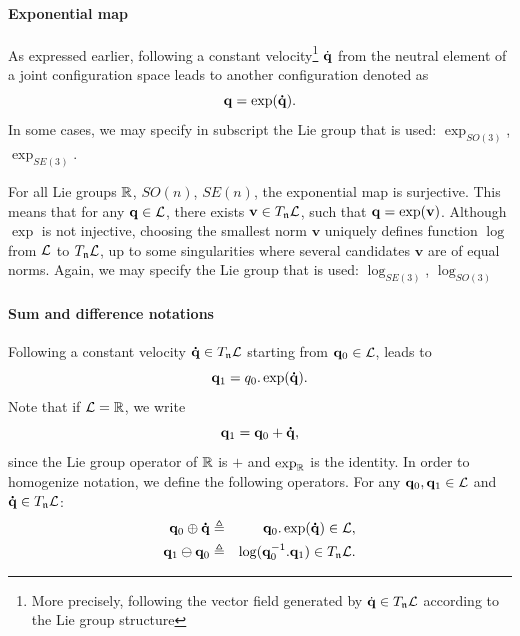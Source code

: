 \paragraph{Exponential map}

As expressed earlier, following a constant velocity\footnote{More precisely, following the vector field generated by $\dot{\mathbf{q}}\in T_{\mathfrak{n}}\mathcal{L}$ according to the Lie group structure} $\dot{\mathbf{q}}$ from the neutral element of a joint configuration space leads to another configuration denoted as
$$
\mathbf{q} = \exp(\mathbf{\dot{q}}).
$$
In some cases, we may specify in subscript the Lie group that is used: \href{https://github.com/stack-of-tasks/pinocchio/blob/f8f3b9a24eab527df79650e3dc73410f9a46a2b2/src/spatial/explog.hpp#L34}{$\exp_{SO(3)}$}, \href{https://github.com/stack-of-tasks/pinocchio/blob/f8f3b9a24eab527df79650e3dc73410f9a46a2b2/src/spatial/explog.hpp#L236}{$\exp_{SE(3)}$}.

For all Lie groups $\mathbb{R}$, $SO(n)$, $SE(n)$, the exponential map is surjective. This means that for any $\mathbf{q}\in\mathcal{L}$, there exists $\mathbf{v}\in T_{\mathfrak{n}}\mathcal{L}$, such that $\mathbf{q} = \exp(\mathbf{v})$.
Although $\exp$ is not injective, choosing the smallest norm $\mathbf{v}$ uniquely defines function $\log$ from $\mathcal{L}$ to $T_{\mathfrak{n}}\mathcal{L}$, up to some singularities where several candidates $\mathbf{v}$ are of equal norms.
Again, we may specify the Lie group that is used: \href{https://github.com/stack-of-tasks/pinocchio/blob/f8f3b9a24eab527df79650e3dc73410f9a46a2b2/src/spatial/log.hxx#L112}{$\log_{SE(3)}$}, \href{https://github.com/stack-of-tasks/pinocchio/blob/f8f3b9a24eab527df79650e3dc73410f9a46a2b2/src/spatial/log.hxx#L15}{$\log_{SO(3)}$}

\paragraph{Sum and difference notations}

Following a constant velocity $\mathbf{\dot{q}}\in T_{\mathfrak{n}}\mathcal{L}$ starting from $\mathbf{q}_0\in\mathcal{L}$, leads to
$$
\mathbf{q}_1 = q_0.\exp(\mathbf{\dot{q}}).
$$
Note that if $\mathcal{L}=\mathbb{R}$, we write
$$
\mathbf{q}_1 = \mathbf{q}_0 + \mathbf{\dot{q}},
$$
since the Lie group operator of $\mathbb{R}$ is $+$ and $\exp_{\mathbb{R}}$ is the identity.
In order to homogenize notation, we define the following operators. For any
$\mathbf{q}_0,\mathbf{q}_1\in\mathcal{L}$ and $\mathbf{\dot{q}}\in T_{\mathfrak{n}}\mathcal{L}$:
\begin{eqnarray}\label{eq:plus}
  \conf_0 \oplus \dconf &\triangleq& \conf_0.\exp(\dconf) \in \liegroup,\\
  \label{eq:minus}
  \conf_1 \ominus \conf_0 &\triangleq& \log(\conf_0^{-1}.\conf_1) \in T_{\neutral}\liegroup.
\end{eqnarray}

